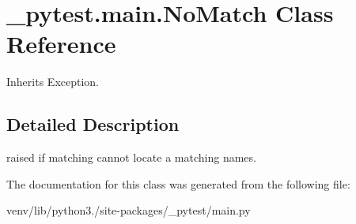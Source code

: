 \hypertarget{class__pytest_1_1main_1_1_no_match}{}\section{\+\_\+pytest.\+main.\+No\+Match Class Reference}
\label{class__pytest_1_1main_1_1_no_match}


Inherits Exception.



\subsection{Detailed Description}
\begin{DoxyVerb}raised if matching cannot locate a matching names. \end{DoxyVerb}
 

The documentation for this class was generated from the following file\+:\begin{DoxyCompactItemize}
\item 
venv/lib/python3./site-\/packages/\+\_\+pytest/main.\+py\end{DoxyCompactItemize}
